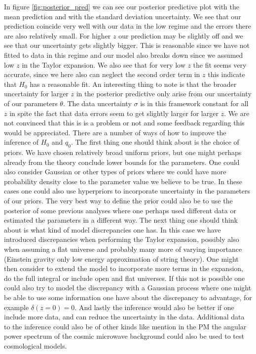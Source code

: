 \documentclass[11pt,a4paper]{article}
\begin{document}
In figure \ref{fig:posterior_pred} we can see our posterior predictive plot with the mean prediction and with the standard deviation uncertainty. We see that our prediction coincide very well with our data in the low regime and the errors there are also relatively small. For higher $z$ our prediction may be slightly off and we see that our uncertainty gets slightly bigger. This is reasonable since we have not fitted to data in this regime and our model also breaks down since we assumed low $z$ in the Taylor expansion. We also see that for very low $z$ the fit seems very accurate, since we here also can neglect the second order term in $z$ this indicate that $H_0$ has a reasonable fit. An interesting thing to note is that the broader uncertainty for larger $z$ in the posterior predictive only arise from our uncertainty of our parameters $\theta$. The data uncertainty $\sigma$ is in this framework constant for all $z$ in spite the fact that data errors seem to get slightly larger for larger $z$. We are not convinced that this is is a problem or not and some feedback regarding this would be appreciated.
There are a number of ways of how to improve the inference of $H_0$ and $q_0$. The first thing one should think about is the choice of priors. We have chosen relatively broad uniform priors, but one might perhaps already from the theory conclude lower bounds for the parameters. One could also consider Gaussian or other types of priors where we could have more probability density close to the parameter value we believe to be true. In these cases one could also use hyperpriors to incorporate uncertainty in the parameters of our priors. The very best way to define the prior could also be to use the posterior of some previous analyses where one perhaps used different data or estimated the parameters in a different way. The next thing one should think about is what kind of model discrepancies one has. In this case we have introduced discrepancies when performing the Taylor expansion, possibly also when assuming a flat universe and probably many more of varying importance (Einstein gravity only low energy approximation of string theory). One might then consider to extend the model to incorporate more terms in the expansion, do the full integral or include open and flat universes. If this not is possible one could also try to model the discrepancy with a Gaussian process where one might be able to use some information one have about the discrepancy to advantage, for example $\delta(z = 0) = 0$. And lastly the inference would also be better if one include more data, and can reduce the uncertainty in the data. Additional data to the inference could also be of other kinds like mention in the PM the angular power spectrum of the cosmic microwave background could also be used to test cosmological models. 
\end{document}
